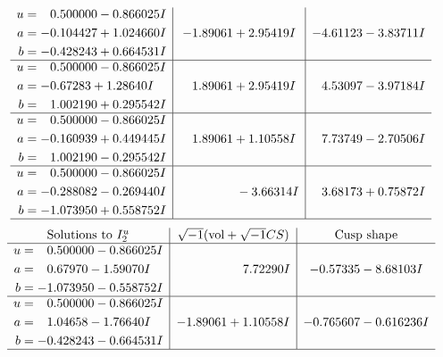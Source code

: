 \documentclass[1p]{elsarticle_modified}
\theoremstyle{definition}
\newcommand{\I}{\sqrt{-1}}
\begin{document}
$$\begin{array}{c|c|c}
\begin{aligned}
u &= \phantom{-}0.500000 - 0.866025 I \\
a &= -0.104427 + 1.024660 I \\
b &= -0.428243 + 0.664531 I\end{aligned}
 & -1.89061 + 2.95419 I & -4.61123 - 3.83711 I \\ \hline\begin{aligned}
u &= \phantom{-}0.500000 - 0.866025 I \\
a &= -0.67283 + 1.28640 I \\
b &= \phantom{-}1.002190 + 0.295542 I\end{aligned}
 & \phantom{-}1.89061 + 2.95419 I & \phantom{-}4.53097 - 3.97184 I \\ \hline\begin{aligned}
u &= \phantom{-}0.500000 - 0.866025 I \\
a &= -0.160939 + 0.449445 I \\
b &= \phantom{-}1.002190 - 0.295542 I\end{aligned}
 & \phantom{-}1.89061 + 1.10558 I & \phantom{-}7.73749 - 2.70506 I \\ \hline\begin{aligned}
u &= \phantom{-}0.500000 - 0.866025 I \\
a &= -0.288082 - 0.269440 I \\
b &= -1.073950 + 0.558752 I\end{aligned}
 & \phantom{-0.000000 } -3.66314 I & \phantom{-}3.68173 + 0.75872 I\\
 \hline 
 \end{array}$$\newpage$$\begin{array}{c|c|c}  
\text{Solutions to }I^u_{2}& \I (\text{vol} + \sqrt{-1}CS) & \text{Cusp shape}\\
 \hline 
\begin{aligned}
u &= \phantom{-}0.500000 - 0.866025 I \\
a &= \phantom{-}0.67970 - 1.59070 I \\
b &= -1.073950 - 0.558752 I\end{aligned}
 & \phantom{-0.000000 -}7.72290 I & -0.57335 - 8.68103 I \\ \hline\begin{aligned}
u &= \phantom{-}0.500000 - 0.866025 I \\
a &= \phantom{-}1.04658 - 1.76640 I \\
b &= -0.428243 - 0.664531 I\end{aligned}
 & -1.89061 + 1.10558 I & -0.765607 - 0.616236 I\\
 \hline 
 \end{array}$$\newpage\newpage\renewcommand{\arraystretch}{1}
\end{document}
